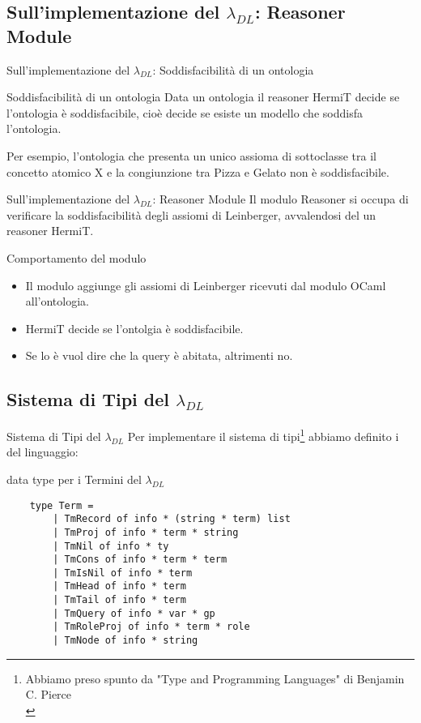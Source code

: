 \subsection{Sull'implementazione del $\lambda_{DL}$: Reasoner Module}
\begin{frame}{Sull'implementazione del $\lambda_{DL}$: Soddisfacibilità di un ontologia}
    \begin{block}{Soddisfacibilità di un ontologia}
        Data un ontologia il reasoner HermiT decide se l'ontologia è soddisfacibile, cioè decide se esiste un modello che soddisfa l'ontologia.
     \end{block}
    \begin{example}
        Per esempio, l'ontologia che presenta un unico assioma di sottoclasse tra il concetto atomico X e la congiunzione tra Pizza e Gelato non è soddisfacibile.
    \end{example}
\end{frame}

\begin{frame}{Sull'implementazione del $\lambda_{DL}$: Reasoner Module}
    Il modulo Reasoner si occupa di verificare la soddisfacibilità degli assiomi di Leinberger, avvalendosi del un reasoner HermiT.
    \begin{block}{Comportamento del modulo}
        \begin{itemize}
            \item Il modulo aggiunge gli assiomi di Leinberger ricevuti dal modulo OCaml all'ontologia.
            \item HermiT decide se l'ontolgia è soddisfacibile.
            \item Se lo è vuol dire che la query è abitata, altrimenti no. 
        \end{itemize} 
    \end{block}
\end{frame}
\subsection{Sistema di Tipi del $\lambda_{DL}$}
\begin{frame}[containsverbatim]{Sistema di Tipi del $\lambda_{DL}$}
    Per implementare il sistema di tipi\footnote{\scriptsize Abbiamo preso spunto da "Type and Programming Languages" di Benjamin C. Pierce \\} abbiamo definito i  del linguaggio:
    \begin{block}{data type per i Termini del $\lambda_{DL}$}
    \begin{verbatim}
    type Term =
        | TmRecord of info * (string * term) list 
        | TmProj of info * term * string 
        | TmNil of info * ty 
        | TmCons of info * term * term 
        | TmIsNil of info * term 
        | TmHead of info * term 
        | TmTail of info * term  
        | TmQuery of info * var * gp
        | TmRoleProj of info * term * role
        | TmNode of info * string
    \end{verbatim}
    \end{block}
\end{frame}

